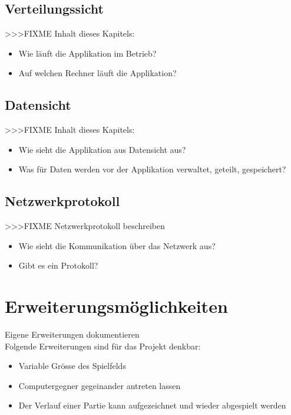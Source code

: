 \documentclass[a4paper, 10pt, fleqn]{article}
\begin{document}
\subsection{Verteilungssicht}
>>>FIXME Inhalt dieses Kapitels: 
\begin{itemize}
    \item Wie läuft die Applikation im Betrieb?
    \item Auf welchen Rechner läuft die Applikation?
\end{itemize}

\subsection{Datensicht}
>>>FIXME Inhalt dieses Kapitels: 
\begin{itemize}
    \item Wie sieht die Applikation aus Datensicht aus?
    \item Was für Daten werden vor der Applikation verwaltet, geteilt, gespeichert?
\end{itemize}

\subsection{Netzwerkprotokoll}
>>>FIXME Netzwerkprotokoll beschreiben
\begin{itemize}
    \item Wie sieht die Kommunikation über das Netzwerk aus?
    \item Gibt es ein Protokoll?
\end{itemize}

\section{Erweiterungsmöglichkeiten}
Eigene Erweiterungen dokumentieren \\
Folgende Erweiterungen sind für das Projekt denkbar:
\begin{itemize}
    \item Variable Grösse des Spielfelds
    \item Computergegner gegeinander antreten lassen
    \item Der Verlauf einer Partie kann aufgezeichnet und wieder abgespielt werden
\end{itemize}
\end{document}

